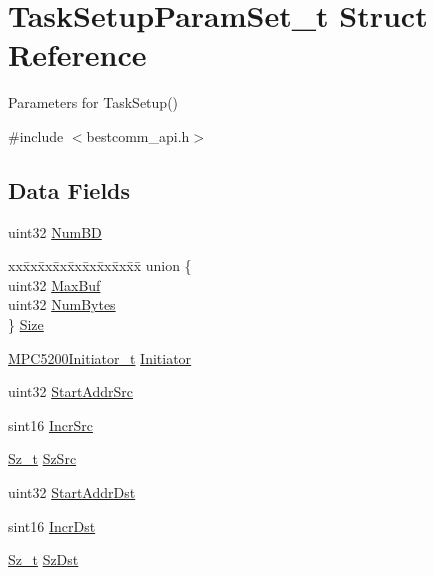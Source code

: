 \hypertarget{structTaskSetupParamSet__t}{}\section{Task\+Setup\+Param\+Set\+\_\+t Struct Reference}
\label{structTaskSetupParamSet__t}


Parameters for Task\+Setup()  




{\ttfamily \#include $<$bestcomm\+\_\+api.\+h$>$}

\subsection*{Data Fields}
\begin{DoxyCompactItemize}
\item 
uint32 \mbox{\hyperlink{structTaskSetupParamSet__t_a95a7fec4fecd144866458b6ab098da03}{Num\+BD}}
\item 
\begin{tabbing}
xx\=xx\=xx\=xx\=xx\=xx\=xx\=xx\=xx\=\kill
union \{\\
\>uint32 \mbox{\hyperlink{structTaskSetupParamSet__t_a7ceabc14c860d9f85240832b91209bd2}{MaxBuf}}\\
\>uint32 \mbox{\hyperlink{structTaskSetupParamSet__t_a2809599ed15bcdba18af31402fd10675}{NumBytes}}\\
\} \mbox{\hyperlink{structTaskSetupParamSet__t_a4d1107abfc3b068e62b758fe009b0d5e}{Size}}\\

\end{tabbing}\item 
\mbox{\hyperlink{bestcomm__api_8h_a6590b0d43c4d03b9deeb566a946cc4a1}{M\+P\+C5200\+Initiator\+\_\+t}} \mbox{\hyperlink{structTaskSetupParamSet__t_a10ca02859f29ab8facc532e17ac57b1c}{Initiator}}
\item 
uint32 \mbox{\hyperlink{structTaskSetupParamSet__t_a3f2118771611378fb042cbb3cc9ea9e5}{Start\+Addr\+Src}}
\item 
sint16 \mbox{\hyperlink{structTaskSetupParamSet__t_a93414fca91a07ca4ec08d9b809ea824b}{Incr\+Src}}
\item 
\mbox{\hyperlink{bestcomm__api_8h_a83efcf1363a5d57a19933e5149ecc816}{Sz\+\_\+t}} \mbox{\hyperlink{structTaskSetupParamSet__t_a64ede19e8b077f261a06159420147b46}{Sz\+Src}}
\item 
uint32 \mbox{\hyperlink{structTaskSetupParamSet__t_a8cb7dc52629ece441752bf6bf4d9d589}{Start\+Addr\+Dst}}
\item 
sint16 \mbox{\hyperlink{structTaskSetupParamSet__t_ae232b3e1ed253baca710adf4c6c17c5d}{Incr\+Dst}}
\item 
\mbox{\hyperlink{bestcomm__api_8h_a83efcf1363a5d57a19933e5149ecc816}{Sz\+\_\+t}} \mbox{\hyperlink{structTaskSetupParamSet__t_a00cc4e75db03c6034bca670e68a5776e}{Sz\+Dst}}
\end{DoxyCompactItemize}



